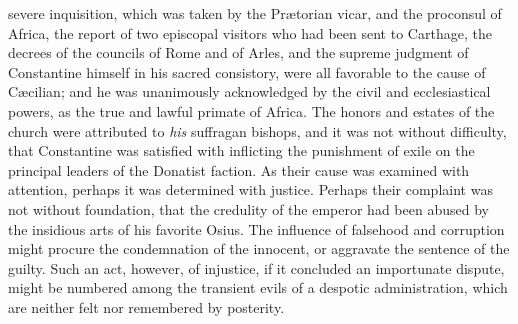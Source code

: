 severe inquisition, which was taken by the Prætorian vicar, and
the proconsul of Africa, the report of two episcopal visitors who
had been sent to Carthage, the decrees of the councils of Rome
and of Arles, and the supreme judgment of Constantine himself in
his sacred consistory, were all favorable to the cause of
Cæcilian; and he was unanimously acknowledged by the civil and
ecclesiastical powers, as the true and lawful primate of Africa.
The honors and estates of the church were attributed to \textit{his}
suffragan bishops, and it was not without difficulty, that
Constantine was satisfied with inflicting the punishment of exile
on the principal leaders of the Donatist faction. As their cause
was examined with attention, perhaps it was determined with
justice. Perhaps their complaint was not without foundation, that
the credulity of the emperor had been abused by the insidious
arts of his favorite Osius. The influence of falsehood and
corruption might procure the condemnation of the innocent, or
aggravate the sentence of the guilty. Such an act, however, of
injustice, if it concluded an importunate dispute, might be
numbered among the transient evils of a despotic administration,
which are neither felt nor remembered by posterity.



